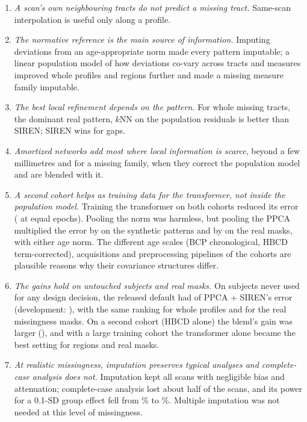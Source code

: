 \documentclass[11pt]{article}
\begin{document}
\begin{enumerate}
\item \emph{A scan's own neighbouring tracts do not predict a missing tract.} Same-scan interpolation is useful only along
a profile.
\item \emph{The normative reference is the main source of information.} Imputing deviations from an age-appropriate
norm made every pattern imputable; a linear population model of how deviations co-vary across tracts and measures
improved whole profiles and regions further and made a missing measure family imputable.
\item \emph{The best local refinement depends on the pattern.} For whole missing tracts, the dominant real pattern, $k$NN
on the population residuals is better than SIREN; SIREN wins for gaps.
\item \emph{Amortized networks add most where local information is scarce}, beyond a few millimetres and for a
missing family, when they correct the population model and are blended with it.
\item \emph{A second cohort helps as training data for the transformer, not inside the population model.} Training the
transformer on both cohorts reduced its error (\pbDAll{} at equal epochs). Pooling the norm was harmless, but pooling the
PPCA multiplied the error by \eFiveB{} on the synthetic patterns and by \eFiveRealB{} on the real masks, with either age
norm. The different age scales (BCP chronological, HBCD term-corrected), acquisitions and preprocessing pipelines of the
cohorts are plausible reasons why their covariance structures differ.
\item \emph{The gains hold on untouched subjects and real masks.} On subjects never used for any design decision, the
released default had \eOneFinalVsDef{} of PPCA + SIREN's error (development: \cORatio), with the same ranking for whole
profiles and for the real missingness masks. On a second cohort (HBCD alone) the blend's gain was larger
(\eThreeFinalVsDef), and with a large training cohort the transformer alone became the best setting for regions and
real masks.
\item \emph{At realistic missingness, imputation preserves typical analyses and complete-case analysis does not.}
Imputation kept all scans with negligible bias and attenuation; complete-case analysis lost about half of the scans, and its power for a
0.1-SD group effect fell from \efSmallFullPower\% to \efSmallCcPower\%. Multiple imputation was not needed at this level of missingness.
\end{enumerate}
\end{document}
